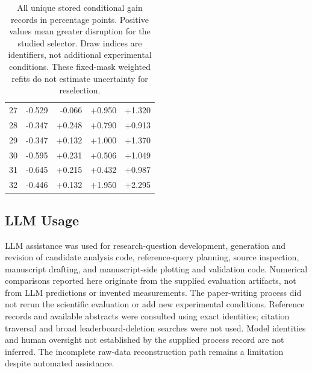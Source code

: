 \documentclass{article}
\begin{document}
\begin{table}[h]
\begin{tabular}{rrrrr}
 27 & -0.529 & -0.066 & +0.950 & +1.320 \\
 28 & -0.347 & +0.248 & +0.790 & +0.913 \\
 29 & -0.347 & +0.132 & +1.000 & +1.370 \\
 30 & -0.595 & +0.231 & +0.506 & +1.049 \\
 31 & -0.645 & +0.215 & +0.432 & +0.987 \\
 32 & -0.446 & +0.132 & +1.950 & +2.295 \\
 \bottomrule
 \end{tabular}
 \caption{All unique stored conditional gain records in percentage points. Positive values mean greater disruption for the studied selector. Draw indices are identifiers, not additional experimental conditions. These fixed-mask weighted refits do not estimate uncertainty for reselection.}
 \label{tab:bootstrap}
\end{table}

\subsection{LLM Usage}
LLM assistance was used for research-question development, generation and revision of candidate analysis code, reference-query planning, source inspection, manuscript drafting, and manuscript-side plotting and validation code. Numerical comparisons reported here originate from the supplied evaluation artifacts, not from LLM predictions or invented measurements. The paper-writing process did not rerun the scientific evaluation or add new experimental conditions. Reference records and available abstracts were consulted using exact identities; citation traversal and broad leaderboard-deletion searches were not used. Model identities and human oversight not established by the supplied process record are not inferred. The incomplete raw-data reconstruction path remains a limitation despite automated assistance.
\end{document}
